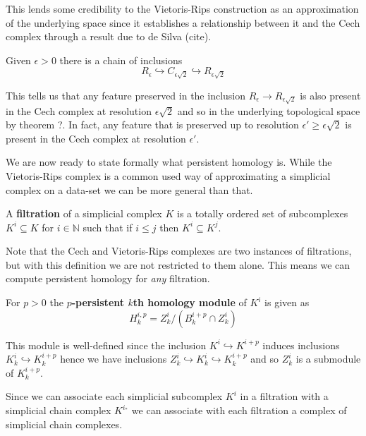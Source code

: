This lends some credibility to the Vietoris-Rips construction as an approximation of the underlying space since it establishes a relationship between it and the Cech complex through a result due to de Silva (cite).
\begin{lemma}
  Given $\epsilon > 0$ there is a chain of inclusions
  \[R_{\epsilon} \hookrightarrow C_{\epsilon \sqrt{2}} \hookrightarrow R_{\epsilon \sqrt{2}}\]
\end{lemma}
This tells us that any feature preserved in the inclusion $R_{\epsilon} \to R_{\epsilon \sqrt{2}}$ is also present in the Cech complex at resolution $\epsilon \sqrt{2}$ and so in the underlying topological space by theorem ?. In fact, any feature that is preserved up to resolution $\epsilon'\geq \epsilon \sqrt{2}$ is present in the Cech complex at resolution $\epsilon'$.

We are now ready to state formally what persistent homology  is. While the Vietoris-Rips complex is a common used way of approximating a simplicial complex on a data-set we can be more general than that.

\begin{definition}
A \textbf{filtration} of a simplicial complex $K$ is a totally ordered set of subcomplexes $K^{i}  \subseteq K$ for $i \in \mathbb{N}$ such that if $i \leq j$ then $K^{i} \subseteq K^{j}$.
\end{definition}

Note that the Cech and Vietoris-Rips complexes are two instances of filtrations, but with this definition we are not restricted to them alone. This means we can compute persistent homology for \textit{any} filtration.

\begin{definition}
  For $p > 0$ the \textbf{$p$-persistent $k$th homology module} of $K^{i}$ is given as
  \[H^{i,p}_{k} = Z^{i}_{k}/(B^{{i+p}}_{k} \cap Z^{i}_{k})\]
\end{definition}
This module is well-defined since the inclusion $K^{i} \hookrightarrow K^{i+p}$ induces inclusions $K^{i}_{k} \hookrightarrow K_{k}^{i+p}$ hence we have inclusions $Z^{i}_{k} \hookrightarrow K^{i}_{k} \hookrightarrow K_{k}^{i+p}$ and so $Z^{i}_{k}$ is a submodule of $K^{i+p}_{k}$.

Since we can associate each simplicial subcomplex $K^{i}$ in a filtration with a simplicial chain complex $K^{i_{*}}$ we can associate with each filtration a complex of simplicial chain complexes.
